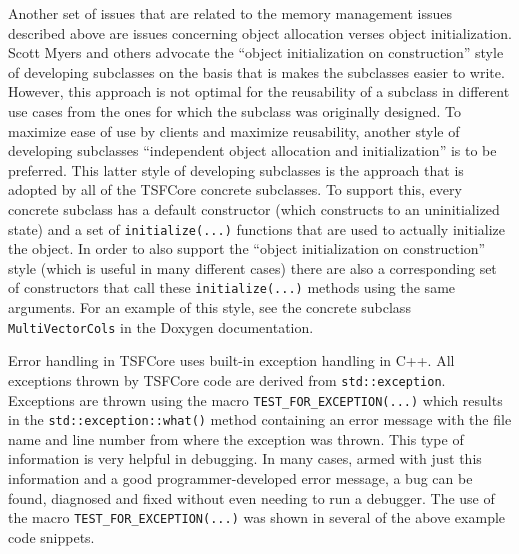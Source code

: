 Another set of issues that are related to the memory management issues
described above are issues concerning object allocation verses object
initialization.  Scott Myers {}\cite{ref:meyers_1996} and others
advocate the ``object initialization on construction'' style of
developing subclasses on the basis that is makes the subclasses easier
to write.  However, this approach is not optimal for the reusability
of a subclass in different use cases from the ones for which the
subclass was originally designed.  To maximize ease of use by clients
and maximize reusability, another style of developing subclasses
``independent object allocation and initialization'' is to be
preferred.  This latter style of developing subclasses is the approach
that is adopted by all of the TSFCore concrete subclasses.  To support
this, every concrete subclass has a default constructor (which
constructs to an uninitialized state) and a set of
{}\texttt{initialize(...)}  functions that are used to actually
initialize the object.  In order to also support the ``object
initialization on construction'' style (which is useful in many
different cases) there are also a corresponding set of constructors
that call these {}\texttt{initialize(...)} methods using the same
arguments.  For an example of this style, see the concrete subclass
{}\texttt{MultiVectorCols} in the Doxygen documentation.

Error handling in TSFCore uses built-in exception handling in C++.
All exceptions thrown by TSFCore code are derived from
{}\texttt{std::exception}.  Exceptions are thrown using the macro
{}\texttt{TEST\_FOR\_EXCEPTION(...)} which results in the
{}\texttt{std::exception::what()} method containing an error message
with the file name and line number from where the exception was
thrown.  This type of information is very helpful in debugging.  In
many cases, armed with just this information and a good
programmer-developed error message, a bug can be found, diagnosed and
fixed without even needing to run a debugger.  The use of the macro
{}\texttt{TEST\_FOR\_EXCEPTION(...)} was shown in several of the above
example code snippets.

